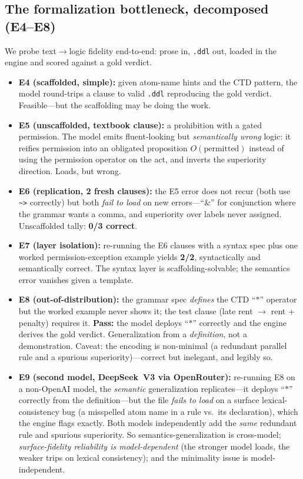 \documentclass[11pt]{article}
\begin{document}
\subsection{The formalization bottleneck, decomposed (E4--E8)}
We probe text$\rightarrow$logic fidelity end-to-end: prose in, \texttt{.ddl} out, loaded
in the engine and scored against a gold verdict.

\begin{itemize}
\item \textbf{E4 (scaffolded, simple):} given atom-name hints and the CTD pattern,
the model round-trips a clause to valid \texttt{.ddl} reproducing the gold verdict. Feasible---but
the scaffolding may be doing the work.
\item \textbf{E5 (unscaffolded, textbook clause):} a prohibition with a gated permission.
The model emits fluent-looking but \emph{semantically wrong} logic: it reifies permission
into an obligated proposition $O(\text{permitted})$ instead of using the permission operator
on the act, and inverts the superiority direction. Loads, but wrong.
\item \textbf{E6 (replication, 2 fresh clauses):} the E5 error does not recur (both use
\texttt{\textasciitilde>} correctly) but both \emph{fail to load} on new errors---``\&'' for
conjunction where the grammar wants a comma, and superiority over labels never assigned.
Unscaffolded tally: \textbf{0/3 correct}.
\item \textbf{E7 (layer isolation):} re-running the E6 clauses with a syntax spec plus one
worked permission-exception example yields \textbf{2/2}, syntactically and semantically
correct. The syntax layer is scaffolding-solvable; the semantics error vanishes given a
template.
\item \textbf{E8 (out-of-distribution):} the grammar spec \emph{defines} the CTD ``$*$''
operator but the worked example never shows it; the test clause (late rent $\rightarrow$
rent + penalty) requires it. \textbf{Pass:} the model deploys ``$*$'' correctly and the
engine derives the gold verdict. Generalization from a \emph{definition}, not a demonstration.
Caveat: the encoding is non-minimal (a redundant parallel rule and a spurious superiority)---correct
but inelegant, and legibly so.
\item \textbf{E9 (second model, DeepSeek~V3 via OpenRouter):} re-running E8 on a non-OpenAI
model, the \emph{semantic} generalization replicates---it deploys ``$*$'' correctly from the
definition---but the file \emph{fails to load} on a surface lexical-consistency bug (a misspelled
atom name in a rule vs.\ its declaration), which the engine flags exactly. Both models independently
add the \emph{same} redundant rule and spurious superiority. So semantics-generalization is
cross-model; \emph{surface-fidelity reliability is model-dependent} (the stronger model loads, the
weaker trips on lexical consistency); and the minimality issue is model-independent.
\end{itemize}
\end{document}
